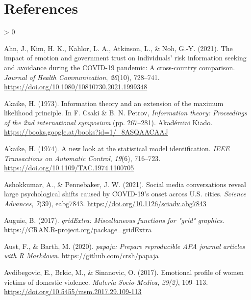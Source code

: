 \documentclass[
  english,
  jou,floatsintext]{apa7}
\newlength{\cslhangindent}
\newenvironment{CSLReferences}[2] %
 {%
  \setlength{\parindent}{0pt}
  \ifodd #1 \everypar{\setlength{\hangindent}{\cslhangindent}}\ignorespaces\fi
  \ifnum #2 > 0
  \setlength{\parskip}{#2\baselineskip}
  \fi
 }%
 {}
\begin{document}
\hypertarget{references}{%
\section{References}\label{references}}

\begingroup
\setlength{\parindent}{-0.5in}
\setlength{\leftskip}{0.5in}

\hypertarget{refs}{}
\begin{CSLReferences}{1}{0}
\leavevmode\hypertarget{ref-Ahn2020}{}%
Ahn, J., Kim, H. K., Kahlor, L. A., Atkinson, L., \& Noh, G.-Y. (2021). The impact of emotion and government trust on individuals' risk information seeking and avoidance during the COVID-19 pandemic: A cross-country comparison. \emph{Journal of Health Communication}, \emph{26}(10), 728--741. \url{https://doi.org/10.1080/10810730.2021.1999348}

\leavevmode\hypertarget{ref-Akaike1973}{}%
Akaike, H. (1973). Information theory and an extension of the maximum likelihood principle. In F. Csaki \& B. N. Petrov, \emph{Information theory: Proceedings of the 2nd international symposium} (pp. 267--281). Akad{é}miai Kiado. \url{https://books.google.at/books?id=1/_8ASQAACAAJ}

\leavevmode\hypertarget{ref-Akaike1974}{}%
Akaike, H. (1974). A new look at the statistical model identification. \emph{IEEE Transactions on Automatic Control}, \emph{19}(6), 716--723. \url{https://doi.org/10.1109/TAC.1974.1100705}

\leavevmode\hypertarget{ref-ashokkumar_pennebaker_2021}{}%
Ashokkumar, A., \& Pennebaker, J. W. (2021). Social media conversations reveal large psychological shifts caused by COVID-19's onset across {U.S.} cities. \emph{Science Advances}, \emph{7}(39), eabg7843. \url{https://doi.org/10.1126/sciadv.abg7843}

\leavevmode\hypertarget{ref-R-gridExtra}{}%
Auguie, B. (2017). \emph{gridExtra: Miscellaneous functions for "grid" graphics}. \url{https://CRAN.R-project.org/package=gridExtra}

\leavevmode\hypertarget{ref-R-papaja}{}%
Aust, F., \& Barth, M. (2020). \emph{{papaja}: {Prepare} reproducible {APA} journal articles with {R Markdown}}. \url{https://github.com/crsh/papaja}

\leavevmode\hypertarget{ref-Avdibegovic2017}{}%
Avdibegovic, E., Brkic, M., \& Sinanovic, O. (2017). Emotional profile of women victims of domestic violence. \emph{Materia Socio-Medica}, \emph{29(2)}, 109--113. \url{https://doi.org/10.5455/msm.2017.29.109-113}


\end{CSLReferences}
\end{document}
